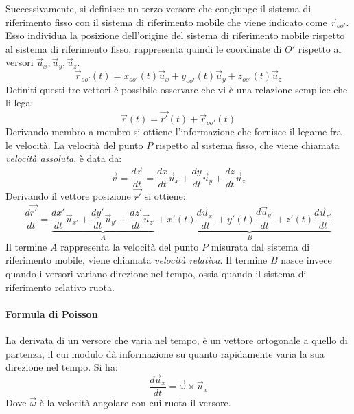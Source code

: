 \documentclass[10pt,a4paper]{book}
\begin{document}
Successivamente, si definisce un terzo versore che congiunge il sistema di riferimento fisso con il sistema di riferimento mobile che viene indicato come $\vec{r}_{oo'}$. Esso individua la posizione dell'origine del sistema di riferimento mobile rispetto al sistema di riferimento fisso, rappresenta quindi le coordinate di $O'$ rispetto ai versori $\vec{u}_x, \vec{u}_y, \vec{u}_z$.
\[
	\vec{r}_{oo'}(t)=x_{oo'}(t)\vec{u}_x+y_{oo'}(t)\vec{u}_y+z_{oo'}(t)\vec{u}_z
\]
Definiti questi tre vettori è possibile osservare che vi è una relazione semplice che li lega:
\begin{equation}
	\label{relativo}
	\boxed{\vec{r}(t)=\vec{r'}(t)+\vec{r}_{oo'}(t)}
\end{equation}
Derivando membro a membro si ottiene l'informazione che fornisce il legame fra le velocità. La velocità del punto $P$ rispetto al sistema fisso, che viene chiamata \emph{velocità assoluta}, è data da:
\[
	\vec{v}=\frac{d\vec{r}}{dt}= \frac{dx}{dt}\vec{u}_x + \frac{dy}{dt}\vec{u}_y + \frac{dz}{dt}\vec{u}_z
\]
Derivando il vettore posizione $\vec{r'}$ si ottiene:
\[
	\frac{d\vec{r'}}{dt}=\underbrace{\frac{dx'}{dt}\vec{u}_{x'}+\frac{dy'}{dt}\vec{u}_{y'}+\frac{dz'}{dt}\vec{u}_{z'}}_A+ \underbrace{x'(t) \frac{d\vec{u}_{x'}}{dt}+ y'(t) \frac{d\vec{u}_{y'}}{dt}+ z'(t) \frac{d\vec{u}_{z'}}{dt}}_B
\]
Il termine $A$ rappresenta la velocità del punto $P$ misurata dal sistema di riferimento mobile, viene chiamata \emph{velocità relativa}. Il termine $B$ nasce invece quando i versori variano direzione nel tempo, ossia quando il sistema di riferimento relativo ruota.

\paragraph{Formula di Poisson} La derivata di un versore che varia nel tempo, è un vettore ortogonale a quello di partenza, il cui modulo dà informazione su quanto rapidamente varia la sua direzione nel tempo. Si ha:
\[
	\frac{d\vec{u}_x}{dt}=\vec{\omega} \times \vec{u}_x
\]
Dove $\vec{\omega}$ è la velocità angolare con cui ruota il versore.
\end{document}
